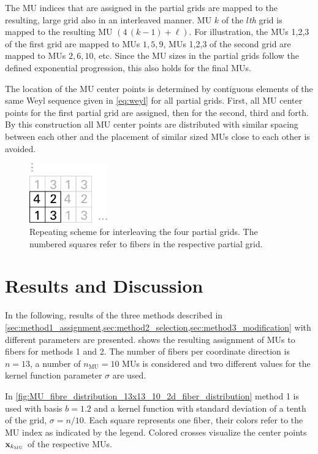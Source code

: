 The MU indices that are assigned in the partial grids are mapped to the resulting, large grid also in an interleaved manner. MU $k$ of the $l$\emph{th} grid is mapped to the resulting MU $(4\,(k-1)+\ell)$. For illustration, the MUs 1,2,3 of the first grid are mapped to MUs $1,5,9$, MUs 1,2,3 of the second grid are mapped to MUs $2,6,10$, etc. Since the MU sizes in the partial grids follow the defined exponential progression, this also holds for the final MUs. 

The location of the MU center points is determined by contiguous elements of the same Weyl sequence given in \cref{eq:weyl} for all partial grids. First, all MU center points for the first partial grid are assigned, then for the second, third and forth. By this construction all MU center points are distributed with similar spacing between each other and the placement of similar sized MUs close to each other is avoided.

\begin{figure}%
  \centering%
  \includegraphics[width=0.3\textwidth]{images/motor_unit_assignment/interleaving_scheme.pdf}%
  \caption{Repeating scheme for interleaving the four partial grids. The numbered squares refer to fibers in the respective partial grid.}%
  \label{fig:interleaving_scheme}%
\end{figure}

\section{Results and Discussion}\label{sec:mu_results_and_discussion}

In the following, results of the three methods described in \cref{sec:method1_assignment,sec:method2_selection,sec:method3_modification} with different parameters are presented.
 shows the resulting assignment of MUs to fibers for methods 1 and 2. The number of fibers per coordinate direction is $n=13$, a number of $n_\text{MU} = 10$ MUs is considered and two different values for the kernel function parameter $\sigma$ are used.

In \cref{fig:MU_fibre_distribution_13x13_10_2d_fiber_distribution} method 1 is used with basis $b=1.2$ and a kernel function with standard deviation of a tenth of the grid, $\sigma=n/10$. Each square represents one fiber, their colors refer to the MU index as indicated by the legend. Colored crosses visualize the center points $\textbf{x}_{k_\text{MU}}$ of the respective MUs.

